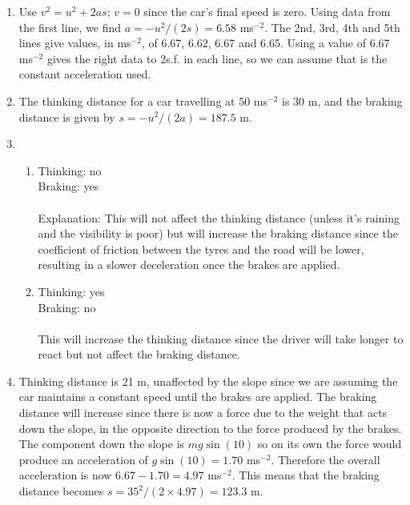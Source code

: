 \begin{problem}[A1989PIIQ9l]
{\begin{enumerate}
Explanation:
Thinking distance is just the distance travelled during the time it takes for the driver to realise he/she needs to brake and then apply the brakes. Therefore there is no acceleration and the thinking distance is equal to the speed of the car multiplied by the time taken for the driver to apply the brakes, i.e. the thinking distance is directly proportional to speed, whereas there is another term due to deceleration in the braking distance. (From $s=ut+at^2/2$). 
\item Use $v^2=u^2+2as$; $v=0$ since the car's final speed is zero. Using data from the first line, we find $a=-u^2/(2s)=6.58$ ms$^{-2}$. The 2nd, 3rd, 4th and 5th lines give values, in ms$^{-2}$, of 6.67, 6.62, 6.67 and 6.65. Using a value of 6.67 ms$^{-2}$ gives the right data to 2s.f. in each line, so we can assume that is the constant acceleration used.  
\item The thinking distance for a car travelling at 50 ms$^{-2}$ is 30 m, and the braking distance is given by $s=-u^2/(2a)=187.5$ m. 
\item 
\begin{enumerate}
\item Thinking: no \\ Braking: yes \\ \\
Explanation: This will not affect the thinking distance (unless it's raining and the visibility is poor) but will increase the braking distance since the coefficient of friction between the tyres and the road will be lower, resulting in a slower deceleration once the brakes are applied. 
\item Thinking: yes \\ Braking: no \\ \\
This will increase the thinking distance since the driver will take longer to react but not affect the braking distance.
\end{enumerate}
\item Thinking distance is 21 m, unaffected by the slope since we are assuming the car maintains a constant speed until the brakes are applied. The braking distance will increase since there is now a force due to the weight that acts down the slope, in the opposite direction to the force produced by the brakes. The component down the slope is $mg\sin(10)$ so on its own the force would produce an acceleration of $g\sin(10)=1.70$ ms$^{-2}$. Therefore the overall acceleration is now $6.67-1.70=4.97$ ms$^{-2}$. This means that the braking distance becomes $s=35^2/(2\times4.97)=123.3$ m. 
\end{enumerate}
}
\end{problem}
